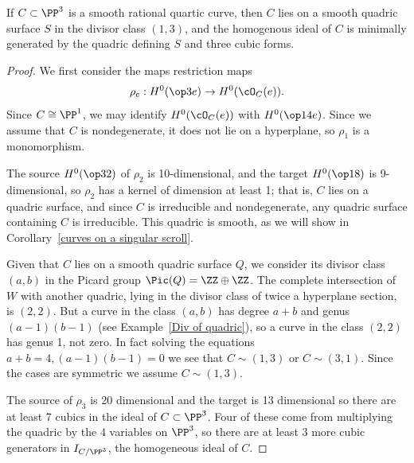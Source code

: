 \begin{proposition}\label{ideal of rational quartic}
If $C\subset \PP^3$ is a smooth rational quartic curve, then $C$ lies on a smooth quadric
surface $S$ in the divisor class $(1,3)$, and the homogenous ideal of $C$ is minimally
generated by the quadric defining $S$ and three cubic forms.
\end{proposition}

\begin{proof}
We first consider the maps restriction maps
$$
\rho_e: H^0(\op3e)\to H^0(\cO_C(e)).
$$
Since $C\cong \PP^1$,
we may identify $H^0(\cO_C(e))$ with $H^0(\op1{4e})$.
 Since we assume that $C$ is nondegenerate, it does not lie on a hyperplane,
 so  $\rho_1$ is a monomorphism. 
 
The source $H^0(\op32)$ of $\rho_2$ is 10-dimensional, and the target $H^0(\op18)$ is
9-dimensional, so $\rho_2$ has a kernel of dimension at least 1; that is, $C$ lies on
a quadric surface, and since $C$ is irreducible and nondegenerate, any quadric surface containing
$C$ is irreducible. This quadric is smooth, as we will show in Corollary~\ref{curves on a singular scroll}.


Given that $C$ lies on a smooth quadric surface $Q$, we consider its divisor class $(a,b)$ in the 
Picard group $\Pic(Q) = \ZZ\oplus \ZZ$. The complete intersection of $W$ with another
quadric, lying in the divisor class of twice a hyperplane section, is $(2,2)$. But a curve
in the class $(a,b)$ has degree $a+b$ and genus $(a-1)(b-1)$ (see Example~\ref{Div of quadric}), so a curve in the class $(2,2)$
has genus 1, not zero. In fact solving the equations $a+b=4, (a-1)(b-1)=0$ we see that $C\sim (1,3)$ or $C\sim (3,1)$. Since the cases
are symmetric we assume $C\sim(1,3)$. 

The source of $\rho_3$ is 20 dimensional and the target is 13 dimensional so there are at least 7
cubics in the ideal of $C\subset \PP^3$. Four of these come from multiplying the quadric
by the 4 variables on $\PP^3$, so there are at least 3 more cubic generators in $I_{C/\PP^3}$,
 the homogeneous ideal of $C$. 


\end{proof}
